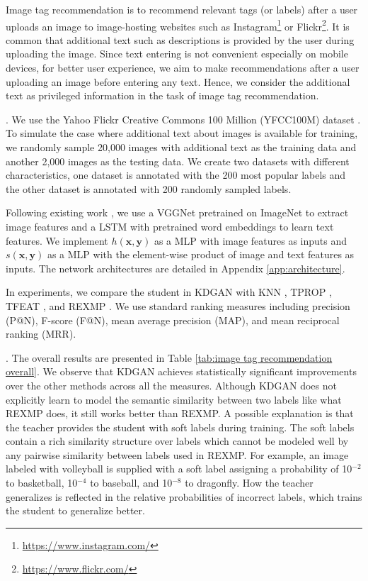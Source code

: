 \documentclass{article}
\newcommand{\OVEC}[1]{\bm{#1}} %
\newcommand{\stdscore}{h(\OVEC{x},\OVEC{y})}
\newcommand{\priscore}{s(\OVEC{x},\OVEC{y})}
\begin{document}
Image tag recommendation is to recommend relevant tags (or labels) after a user uploads an image to image-hosting websites such as Instagram\footnote{\url{https://www.instagram.com/}} or Flickr\footnote{\url{https://www.flickr.com/}}.
It is common that additional text such as descriptions is provided by the user during uploading the image.
Since text entering is not convenient especially on mobile devices, for better user experience, we aim to make recommendations after a user uploading an image before entering any text.
Hence, we consider the additional text as privileged information in the task of image tag recommendation.


.
We use the Yahoo Flickr Creative Commons 100 Million (YFCC100M) dataset \cite{thomee2016yfcc100m}.
To simulate the case where additional text about images is available for training, we randomly sample 20,000 images with additional text as the training data and another 2,000 images as the testing data.
We create two datasets with different characteristics, one dataset is annotated with the 200 most popular labels and the other dataset is annotated with 200 randomly sampled labels.

Following existing work \cite{antol2015vqa}, we use a VGGNet \cite{simonyan2014very} pretrained on ImageNet \cite{deng2009imagenet} to extract image features and a LSTM \cite{hochreiter1997long} with pretrained word embeddings \cite{mikolov2013distributed} to learn text features.
We implement $\stdscore$ as a MLP with image features as inputs and $\priscore$ as a MLP with the element-wise product of image and text features as inputs.
The network architectures are detailed in Appendix \ref{app:architecture}.

In experiments, we compare the student in KDGAN with KNN \cite{makadia2010baselines}, TPROP \cite{guillaumin2009tagprop}, TFEAT \cite{chen2012tag}, and REXMP \cite{li2013classifying}.
We use standard ranking measures including precision (P@N), F-score (F@N), mean average precision (MAP), and mean reciprocal ranking (MRR).

.
The overall results are presented in Table \ref{tab:image tag recommendation overall}.
We observe that KDGAN achieves statistically significant improvements over the other methods across all the measures.
Although KDGAN does not explicitly learn to model the semantic similarity between two labels like what REXMP does, it still works better than REXMP.
A possible explanation is that the teacher provides the student with soft labels during training.
The soft labels contain a rich similarity structure over labels which cannot be modeled well by any pairwise similarity between labels used in REXMP.
For example, an image labeled with volleyball is supplied with a soft label assigning a probability of 10$^{-2}$ to basketball, 10$^{-4}$ to baseball, and 10$^{-8}$ to dragonfly.
How the teacher generalizes is reflected in the relative probabilities of incorrect labels, which trains the student to generalize better.
\end{document}
